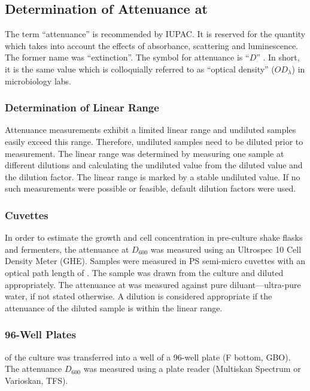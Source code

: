 \subsection{Determination of Attenuance at }
The term \enquote{attenuance} is recommended by IUPAC. It is reserved for the quantity which takes into account the effects of absorbance, scattering and luminescence. The former name was \enquote{extinction}. The symbol for attenuance is \enquote{$D$} \cite{IUPACgoldbook}. In short, it is the same value which is colloquially referred to as \enquote{optical density} ($OD_{\lambda}$) in microbiology labs.

\subsubsection{Determination of Linear Range}
Attenuance measurements exhibit a limited linear range and undiluted samples easily exceed this range. Therefore, undiluted samples need to be diluted prior to measurement. The linear range was determined by measuring one sample at different dilutions and calculating the undiluted value from the diluted value and the dilution factor. The linear range is marked by a stable undiluted value. If no such measurements were possible or feasible, default dilution factors were used.

\subsubsection{Cuvettes}
In order to estimate the growth and cell concentration in pre-culture shake flasks and fermenters, the attenuance at  $D_{600}$ was measured using an Ultrospec 10 Cell Density Meter (GHE). Samples were measured in PS semi-micro cuvettes with an optical path length of .
The sample was drawn from the culture and diluted appropriately. The attenuance at  was measured against pure diluant---ultra-pure water, if not stated otherwise. A dilution is considered appropriate if the attenuance of the diluted sample is within the linear range.

\subsubsection{96-Well Plates}
 of the culture was transferred into a well of a 96-well plate (F bottom, GBO). The attenuance $D_{600}$ was measured using a plate reader (Multiskan Spectrum or Varioskan, TFS).

